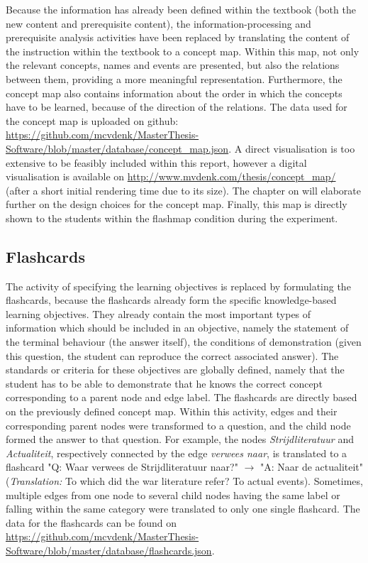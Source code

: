 Because the information has already been defined within the textbook (both the new content and prerequisite content), the information-processing and prerequisite analysis activities have been replaced by translating the content of the instruction within the textbook to a concept map. Within this map, not only the relevant concepts, names and events are presented, but also the relations between them, providing a more meaningful representation. Furthermore, the concept map also contains information about the order in which the concepts have to be learned, because of the direction of the relations. The data used for the concept map is uploaded on github: \url{https://github.com/mcvdenk/MasterThesis-Software/blob/master/database/concept_map.json}. A direct visualisation is too extensive to be feasibly included within this report, however a digital visualisation is available on \url{http://www.mvdenk.com/thesis/concept_map/} (after a short initial rendering time due to its size). The chapter on  will elaborate further on the design choices for the concept map. Finally, this map is directly shown to the students within the flashmap condition during the experiment.

\subsection{Flashcards}

The activity of specifying the learning objectives is replaced by formulating the flashcards, because the flashcards already form the specific knowledge-based learning objectives. They already contain the most important types of information which should be included in an objective, namely the statement of the terminal behaviour (the answer itself), the conditions of demonstration (given this question, the student can reproduce the correct associated answer). The standards or criteria for these objectives are globally defined, namely that the student has to be able to demonstrate that he knows the correct concept corresponding to a parent node and edge label. The flashcards are directly based on the previously defined concept map. Within this activity, edges and their corresponding parent nodes were transformed to a question, and the child node formed the answer to that question. For example, the nodes \emph{Strijdliteratuur} and \emph{Actualiteit}, respectively connected by the edge \emph{verwees naar}, is translated to a flashcard "Q: Waar verwees de Strijdliteratuur naar?" $\rightarrow$ "A: Naar de actualiteit" (\emph{Translation:} To which did the war literature refer? To actual events). Sometimes, multiple edges from one node to several child nodes having the same label or falling within the same category were translated to only one single flashcard. The data for the flashcards can be found on \url{https://github.com/mcvdenk/MasterThesis-Software/blob/master/database/flashcards.json}.

